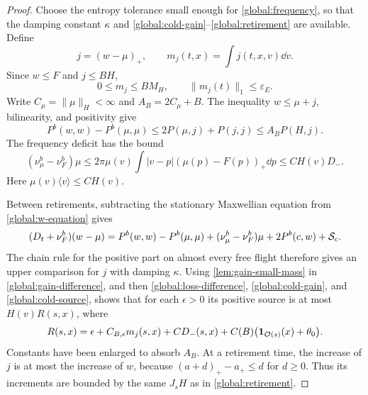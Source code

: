\begin{proof}
Choose the entropy tolerance small enough for
\cref{global:frequency}, so that the damping constant $\kappa$ and
\eqref{global:cold-gain}--\eqref{global:retirement} are available.
Define
\begin{equation}\label{global:excess}
 j=(w-\mu)_+,\qquad m_j(t,x)=\int j(t,x,v)\dd v.
\end{equation}
Since $w\le F$ and $j\le BH$,
\begin{equation}\label{global:excess-mass}
 0\le m_j\le BM_H,
 \qquad\|m_j(t)\|_1\le\varepsilon_E.
\end{equation}
Write $C_\mu=\|\mu\|_H<\infty$ and $A_B=2C_\mu+B$.
The inequality $w\le\mu+j$, bilinearity, and positivity give
\begin{equation}\label{global:gain-difference}
 P^b(w,w)-P^b(\mu,\mu)
 \le2P(\mu,j)+P(j,j)\le A_BP(H,j).
\end{equation}
The frequency deficit has the bound
\begin{equation}\label{global:loss-difference}
 (\nu_\mu^b-\nu_F^b)\mu
 \le2\pi\mu(v)\int|v-p|(\mu(p)-F(p))_+\dd p
 \le CH(v)D_-.
\end{equation}
Here $\mu(v)\langle v\rangle\le CH(v)$.

Between retirements, subtracting the stationary Maxwellian equation
from \eqref{global:w-equation} gives
\[
 (D_t+\nu_F^b)(w-\mu)
 =P^b(w,w)-P^b(\mu,\mu)
   +(\nu_\mu^b-\nu_F^b)\mu+2P^b(c,w)+\mathcal S_c.
\]
The chain rule for the positive part on almost every free flight
therefore gives an upper comparison for $j$ with damping $\kappa$.
Using \cref{lem:gain-small-mass} in \eqref{global:gain-difference},
and then \eqref{global:loss-difference},
\eqref{global:cold-gain}, and \eqref{global:cold-source}, shows that
for each $\epsilon>0$ its positive source is at most $H(v)R(s,x)$,
where
\begin{equation}\label{global:excess-source}
 R(s,x)=\epsilon+C_{B,\epsilon}m_j(s,x)+CD_-(s,x)
           +C(B)\bigl(\mathbf 1_{\mathcal O(s)}(x)+\theta_0\bigr).
\end{equation}
Constants have been enlarged to absorb $A_B$.  At a retirement time,
the increase of $j$ is at most the increase of $w$, because
$(a+d)_+-a_+\le d$ for $d\ge0$.  Thus its increments are bounded by
the same $J_sH$ as in \eqref{global:retirement}.


\end{proof}
